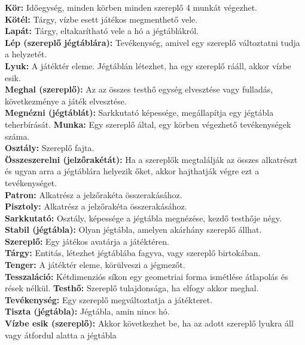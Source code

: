 \textbf{Kör:} Időegység, minden körben minden szereplő 4 munkát végezhet. \\
\textbf{Kötél:} Tárgy, vízbe esett játékos megmenthető vele. \\
\textbf{Lapát:} Tárgy, eltakarítható vele a hó a jégtáblákról. \\
\textbf{Lép (szereplő jégtáblára):} Tevékenység, amivel egy szereplő változtatni tudja a helyzetét. \\
\textbf{Lyuk:} A játéktér eleme. Jégtáblán létezhet, ha egy szereplő rááll, akkor vízbe esik. \\
\textbf{Meghal (szereplő):} Az az összes testhő egység elvesztése vagy fulladás, következménye a játék elvesztése. \\
\textbf{Megnézni (jégtáblát):} Sarkkutató képessége, megállapítja egy jégtábla teherbírását.
\textbf{Munka:} Egy szereplő által, egy körben végezhető tevékenységek száma. \\
\textbf{Osztály:} Szereplő fajta. \\
\textbf{Összeszerelni (jelzőrakétát):} Ha a szereplők megtalálják az összes alkatrészt és ugyan arra a jégtáblára helyezik őket, akkor hajthatják végre ezt a tevékenységet. \\
\textbf{Patron:} Alkatrész a jelzőrakéta összerakásához. \\
\textbf{Pisztoly:} Alkatrész  a jelzőrakéta összerakásához.\\
\textbf{Sarkkutató:} Osztály, képessége a jégtábla megnézése, kezdő testhője négy. \\
\textbf{Stabil (jégtábla):} Olyan jégtábla, amelyen akárhány szereplő állhat. \\
\textbf{Szereplő:} Egy játékos avatárja a játéktéren. \\
\textbf{Tárgy:} Entitás, létezhet jégtáblába fagyva, vagy szereplő birtokában. \\
\textbf{Tenger:} A játéktér eleme, körülveszi a jégmezőt. \\
\textbf{Tesszaláció:} Kétdimenziós síkon egy geometriai forma ismétlése átlapolás és rések nélkül.
\textbf{Testhő:} Szereplő tulajdonsága, ha elfogy akkor meghal. \\
\textbf{Tevékenység:} Egy szereplő megváltoztatja a játékteret. \\
\textbf{Tiszta (jégtábla):} Jégtábla, amin nincs hó. \\
\textbf{Vízbe esik (szereplő):} Akkor következhet be, ha az adott szereplő lyukra áll vagy átfordul alatta a jégtábla \\
\newpage


